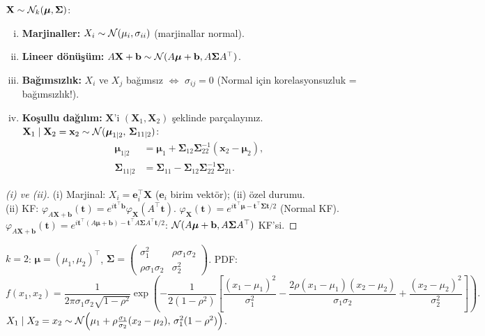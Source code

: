 \begin{teorem}
\label{thm:cb_normal}
$\mathbf{X} \sim \mathcal{N}_k(\boldsymbol{\mu}, \boldsymbol{\Sigma})$:
\begin{enumerate}[(i)]
  \item \textbf{Marjinaller:} $X_i \sim \mathcal{N}(\mu_i, \sigma_{ii})$ (marjinallar normal).
  \item \textbf{Lineer dönüşüm:} $A\mathbf{X} + \mathbf{b} \sim \mathcal{N}(A\boldsymbol{\mu}+\mathbf{b}, A\boldsymbol{\Sigma}A^\top)$.
  \item \textbf{Bağımsızlık:} $X_i$ ve $X_j$ bağımsız $\Leftrightarrow$ $\sigma_{ij} = 0$ (Normal için korelasyonsuzluk = bağımsızlık!).
  \item \textbf{Koşullu dağılım:} $\mathbf{X}$'i $(\mathbf{X}_1, \mathbf{X}_2)$ şeklinde parçalayınız.
  $\mathbf{X}_1 \mid \mathbf{X}_2 = \mathbf{x}_2 \sim \mathcal{N}(\boldsymbol{\mu}_{1|2},\, \boldsymbol{\Sigma}_{11|2})$:
  \begin{align*}
    \boldsymbol{\mu}_{1|2} &= \boldsymbol{\mu}_1 + \boldsymbol{\Sigma}_{12}\boldsymbol{\Sigma}_{22}^{-1}(\mathbf{x}_2 - \boldsymbol{\mu}_2),\\
    \boldsymbol{\Sigma}_{11|2} &= \boldsymbol{\Sigma}_{11} - \boldsymbol{\Sigma}_{12}\boldsymbol{\Sigma}_{22}^{-1}\boldsymbol{\Sigma}_{21}.
  \end{align*}
\end{enumerate}
\end{teorem}

\begin{proof}[(i) ve (ii)]
(i) Marjinal: $X_i = \mathbf{e}_i^\top \mathbf{X}$ ($\mathbf{e}_i$ birim vektör); (ii) özel durumu.\\
(ii) KF: $\varphi_{A\mathbf{X}+\mathbf{b}}(\mathbf{t}) = e^{i\mathbf{t}^\top \mathbf{b}} \varphi_{\mathbf{X}}(A^\top \mathbf{t})$.
$\varphi_{\mathbf{X}}(\mathbf{t}) = e^{i\mathbf{t}^\top\boldsymbol{\mu} - \mathbf{t}^\top\boldsymbol{\Sigma}\mathbf{t}/2}$ (Normal KF).
$\varphi_{A\mathbf{X}+\mathbf{b}}(\mathbf{t}) = e^{i\mathbf{t}^\top(A\boldsymbol{\mu}+\mathbf{b}) - \mathbf{t}^\top A\boldsymbol{\Sigma}A^\top\mathbf{t}/2}$: $\mathcal{N}(A\boldsymbol{\mu}+\mathbf{b}, A\boldsymbol{\Sigma}A^\top)$ KF'si.
\end{proof}

\begin{ornek}
$k=2$: $\boldsymbol{\mu} = (\mu_1, \mu_2)^\top$,
$\boldsymbol{\Sigma} = \begin{pmatrix}\sigma_1^2 & \rho\sigma_1\sigma_2 \\ \rho\sigma_1\sigma_2 & \sigma_2^2\end{pmatrix}$.
PDF:
\[
  f(x_1,x_2) = \frac{1}{2\pi\sigma_1\sigma_2\sqrt{1-\rho^2}}
  \exp\!\left(-\frac{1}{2(1-\rho^2)}\left[\frac{(x_1-\mu_1)^2}{\sigma_1^2}
  - \frac{2\rho(x_1-\mu_1)(x_2-\mu_2)}{\sigma_1\sigma_2}
  + \frac{(x_2-\mu_2)^2}{\sigma_2^2}\right]\right).
\]
$X_1 \mid X_2 = x_2 \sim \mathcal{N}\!\left(\mu_1 + \rho\frac{\sigma_1}{\sigma_2}(x_2-\mu_2),\,
\sigma_1^2(1-\rho^2)\right)$.
\end{ornek}

